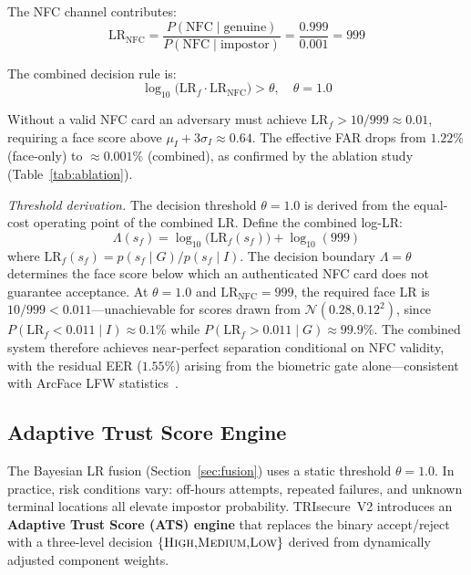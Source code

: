 \documentclass[conference]{IEEEtran}
\begin{document}
The NFC channel contributes:
\begin{equation}
  \mathrm{LR}_{\mathrm{NFC}} =
  \frac{P(\mathrm{NFC}\mid\text{genuine})}{P(\mathrm{NFC}\mid\text{impostor})}
  = \frac{0.999}{0.001} = 999
\end{equation}

The combined decision rule is:
\begin{equation}
  \log_{10}\!\bigl(\mathrm{LR}_f \cdot \mathrm{LR}_{\mathrm{NFC}}\bigr) >
  \theta, \quad \theta = 1.0
\end{equation}

Without a valid NFC card an adversary must achieve
\(\mathrm{LR}_f > 10/999 \approx 0.01\), requiring a face score above
\(\mu_I + 3\sigma_I \approx 0.64\). The effective FAR drops from
\(1.22\%\) (face-only) to \(\approx 0.001\%\) (combined), as confirmed
by the ablation study (Table~\ref{tab:ablation}).

\textit{Threshold derivation.} The decision threshold \(\theta=1.0\) is
derived from the equal-cost operating point of the combined LR. Define
the combined log-LR:
\begin{equation}
  \Lambda(s_f) = \log_{10}\!\bigl(\mathrm{LR}_f(s_f)\bigr)
               + \log_{10}(999)
\end{equation}
where \(\mathrm{LR}_f(s_f) = p(s_f\mid G)/p(s_f\mid I)\). The decision
boundary \(\Lambda = \theta\) determines the face score below which an
authenticated NFC card does not guarantee acceptance.
At \(\theta{=}1.0\) and \(\mathrm{LR}_{\mathrm{NFC}}{=}999\), the
required face LR is \(10/999 < 0.011\)—unachievable for scores drawn
from \(\mathcal{N}(0.28, 0.12^2)\), since
\(P(\mathrm{LR}_f < 0.011 \mid I) \approx 0.1\%\) while
\(P(\mathrm{LR}_f > 0.011 \mid G) \approx 99.9\%\). The combined
system therefore achieves near-perfect separation conditional on NFC
validity, with the residual EER (\(1.55\%\)) arising from the biometric
gate alone—consistent with ArcFace LFW statistics~\cite{deng2019arcface}.

\subsection{Adaptive Trust Score Engine}
\label{sec:ats}

The Bayesian LR fusion (Section~\ref{sec:fusion}) uses a static threshold
\(\theta=1.0\). In practice, risk conditions vary: off-hours attempts,
repeated failures, and unknown terminal locations all elevate impostor
probability. TRIsecure~V2 introduces an \textbf{Adaptive Trust Score (ATS)
engine} that replaces the binary accept/reject with a three-level decision
\(\{$\textsc{High}$, $\textsc{Medium}$, $\textsc{Low}$\}\) derived from
dynamically adjusted component weights.
\end{document}
